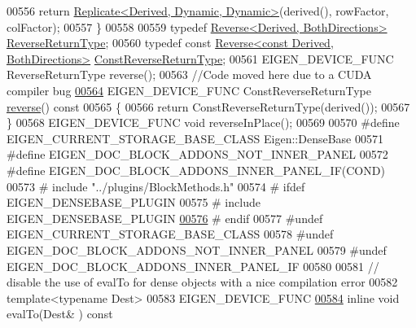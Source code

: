 \begin{DoxyCode}
00556       \textcolor{keywordflow}{return} \hyperlink{group___core___module_class_eigen_1_1_replicate}{Replicate<Derived, Dynamic, Dynamic>}(derived(), rowFactor,
       colFactor);
00557     \}
00558 
00559     \textcolor{keyword}{typedef} \hyperlink{group___core___module_class_eigen_1_1_reverse}{Reverse<Derived, BothDirections>} 
      \hyperlink{group___core___module_class_eigen_1_1_reverse}{ReverseReturnType};
00560     \textcolor{keyword}{typedef} \textcolor{keyword}{const} \hyperlink{group___core___module_class_eigen_1_1_reverse}{Reverse<const Derived, BothDirections>} 
      \hyperlink{group___core___module_class_eigen_1_1_reverse}{ConstReverseReturnType};
00561     EIGEN\_DEVICE\_FUNC ReverseReturnType reverse();
00563     \textcolor{comment}{//Code moved here due to a CUDA compiler bug}
\hyperlink{group___core___module_ada2ea028e35de0beef990fa0f6e3dee1}{00564}     EIGEN\_DEVICE\_FUNC ConstReverseReturnType \hyperlink{group___core___module_ada2ea028e35de0beef990fa0f6e3dee1}{reverse}()\textcolor{keyword}{ const}
00565 \textcolor{keyword}{    }\{
00566       \textcolor{keywordflow}{return} ConstReverseReturnType(derived());
00567     \}
00568     EIGEN\_DEVICE\_FUNC \textcolor{keywordtype}{void} reverseInPlace();
00569 
00570 \textcolor{preprocessor}{#define EIGEN\_CURRENT\_STORAGE\_BASE\_CLASS Eigen::DenseBase}
00571 \textcolor{preprocessor}{#define EIGEN\_DOC\_BLOCK\_ADDONS\_NOT\_INNER\_PANEL}
00572 \textcolor{preprocessor}{#define EIGEN\_DOC\_BLOCK\_ADDONS\_INNER\_PANEL\_IF(COND)}
00573 \textcolor{preprocessor}{#   include "../plugins/BlockMethods.h"}
00574 \textcolor{preprocessor}{#   ifdef EIGEN\_DENSEBASE\_PLUGIN}
00575 \textcolor{preprocessor}{#     include EIGEN\_DENSEBASE\_PLUGIN}
\hyperlink{group___core___module_abfa7020bf152e0a39e2a124080c4d59c}{00576} \textcolor{preprocessor}{#   endif}
00577 \textcolor{preprocessor}{#undef EIGEN\_CURRENT\_STORAGE\_BASE\_CLASS}
00578 \textcolor{preprocessor}{#undef EIGEN\_DOC\_BLOCK\_ADDONS\_NOT\_INNER\_PANEL}
00579 \textcolor{preprocessor}{#undef EIGEN\_DOC\_BLOCK\_ADDONS\_INNER\_PANEL\_IF}
00580 
00581     \textcolor{comment}{// disable the use of evalTo for dense objects with a nice compilation error}
00582     \textcolor{keyword}{template}<\textcolor{keyword}{typename} Dest>
00583     EIGEN\_DEVICE\_FUNC
\hyperlink{group___core___module_ad770bd93a55f1b4a561a00dbda6207d7}{00584}     \textcolor{keyword}{inline} \textcolor{keywordtype}{void} evalTo(Dest& )\textcolor{keyword}{ const}

\end{DoxyCode}
